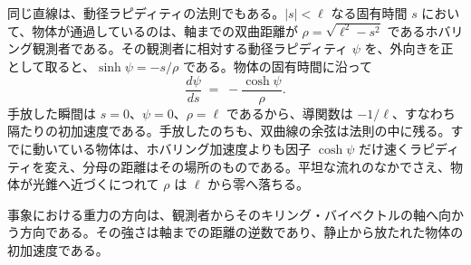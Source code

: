 \documentclass[a4paper]{article}
\begin{document}
同じ直線は、動径ラピディティの法則でもある。\(|s|<\ell\) なる固有時間 \(s\) において、物体が通過しているのは、軸までの双曲距離が \(\rho=\sqrt{\ell^{2}-s^{2}}\) であるホバリング観測者である。その観測者に相対する動径ラピディティ \(\psi\) を、外向きを正として取ると、\(\sinh\psi=-s/\rho\) である。物体の固有時間に沿って
\begin{equation}
\frac{d\psi}{ds} \;=\; -\frac{\cosh\psi}{\rho}.
\label{eq:flat-rapidity}
\end{equation}
手放した瞬間は \(s=0\)、\(\psi=0\)、\(\rho=\ell\) であるから、導関数は \(-1/\ell\)、すなわち隔たりの初加速度である。手放したのちも、双曲線の余弦は法則の中に残る。すでに動いている物体は、ホバリング加速度よりも因子 \(\cosh\psi\) だけ速くラピディティを変え、分母の距離はその場所のものである。平坦な流れのなかでさえ、物体が光錐へ近づくにつれて \(\rho\) は \(\ell\) から零へ落ちる。

事象における重力の方向は、観測者からそのキリング・バイベクトルの軸へ向かう方向である。その強さは軸までの距離の逆数であり、静止から放たれた物体の初加速度である。
\end{document}
